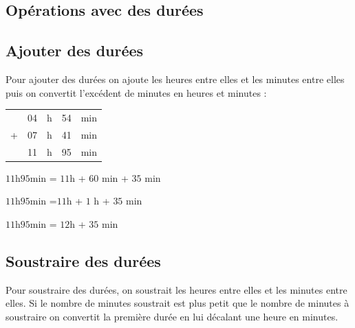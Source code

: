 \begin{pageCours}
\section{Opérations avec des durées}

\subsection{Ajouter des durées}

\begin{Mt}
Pour ajouter des durées on ajoute les heures entre elles et les minutes entre elles puis on convertit l'excédent de minutes en heures et minutes :

\begin{minipage}{0.15\linewidth}
\begin{tabular}{ccccc} 
& 04 & h & 54 & min \\ 
+  & 07 & h & 41 & min\\ 
\hline 
& 11 & h & 95 & min \\
\end{tabular} 
\end{minipage}
\hfill
\begin{minipage}{0.7\linewidth}
  $11$h$95$min = $11$h + $60$ min + $35$ min 
 
  $11$h$95$min =$11$h + $1$ h + $35$ min 
 
  $11$h$95$min = $12$h + $35$ min
\end{minipage}

\end{Mt}
%
%



\subsection{Soustraire des durées}

\begin{Mt}
Pour soustraire des durées, on soustrait les heures entre elles et les minutes entre elles. Si {\color{sacado_red} le nombre de minutes} soustrait est plus petit que le {\color{sacado_blue} nombre de minutes à soustraire} on convertit la première durée en lui décalant une heure en minutes.
 

\end{Mt}
\end{pageCours}
